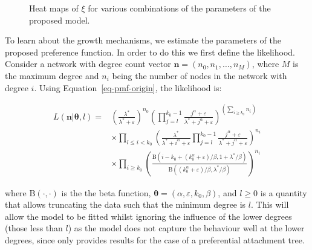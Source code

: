 \documentclass[
  sn-basic,
  10pt,
]{sn-jnl}
\theoremstyle{plain}
\theoremstyle{plain}
\theoremstyle{remark}
\begin{document}
\begin{figure}


\caption{\label{fig-polyheat}Heat maps of \(\xi\) for various
combinations of the parameters of the proposed model.}

\end{figure}%

\newpage

To learn about the growth mechanisms, we estimate the parameters of the
proposed preference function. In order to do this we first define the
likelihood. Consider a network with degree count vector
\(\pmb n = (n_0, n_1, \ldots, n_M)\), where \(M\) is the maximum degree
and \(n_i\) being the number of nodes in the network with degree \(i\).
Using Equation~\ref{eq-pmf-origin}, the likelihood is:

\begin{align*}
L(\pmb n | \pmb \theta,l) = &\left(\frac{\lambda^*}{\lambda^*+\varepsilon}\right)^{n_0}\left(\prod_{j=l}^{k_0-1}\frac{j^\alpha +\varepsilon}{\lambda^* + j^\alpha +\varepsilon}\right)^{\left(\sum_{i\ge k_0}n_{i}\right)} \\ &\times \prod_{l \le i<k_0}\left(\frac{\lambda^*}{\lambda^* +i^\alpha + \varepsilon } \prod_{j=l}^{k_0-1}\frac{j^\alpha + \varepsilon}{\lambda^* + j^\alpha + \varepsilon}\right)^{n_i}\\ &\times \prod_{i\ge k_0}\left(\frac{\text{B}(i-k_0 + (k_0^\alpha + \varepsilon)/\beta,1+\lambda^*/\beta)}{\text{B}((k_0^\alpha + \varepsilon)/\beta,\lambda^*/\beta)}\right)^{n_i}
\end{align*}\label{eq-lh}

where \(\text{B}(\cdot,\cdot)\) is the the beta function,
\(\pmb \theta = (\alpha, \varepsilon, k_0,\beta)\), and \(l\ge0\) is a
quantity that allows truncating the data such that the minimum degree is
\(l\). This will allow the model to be fitted whilst ignoring the
influence of the lower degrees (those less than \(l\)) as the model does
not capture the behaviour well at the lower degrees, since
\citet{rudas07} only provides results for the case of a preferential
attachment tree.
\end{document}

